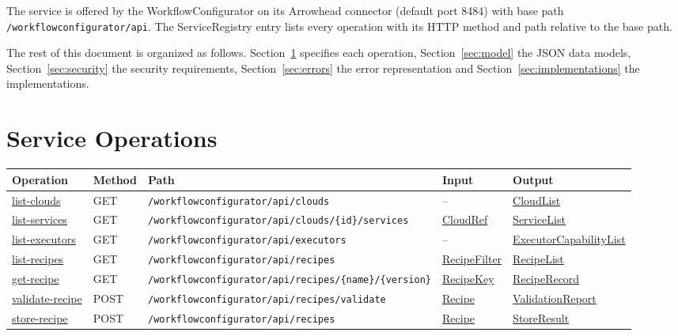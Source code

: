 \documentclass[a4paper]{arrowhead}
\newcommand{\mref}[1]{{\textcolor{ArrowheadPurple}{\hyperref[sec:model:#1]{#1}}}}
\newcommand{\oref}[1]{{\textcolor{ArrowheadBlue}{\hyperref[sec:operations:#1]{#1}}}}
\begin{document}
The service is offered by the WorkflowConfigurator on its Arrowhead connector (default port 8484) with base path \texttt{/\allowbreak{}workflowconfigurator/\allowbreak{}api}.
The ServiceRegistry entry lists every operation with its HTTP method and path relative to the base path.

The rest of this document is organized as follows. Section~\ref{sec:operations} specifies each operation,
Section~\ref{sec:model} the JSON data models, Section~\ref{sec:security} the security requirements,
Section~\ref{sec:errors} the error representation and Section~\ref{sec:implementations} the implementations.

\newpage
\section{Service Operations}
\label{sec:operations}

{\small
\begin{longtable}{|p{3.0cm}|p{1.5cm}|p{5.3cm}|p{3.0cm}|p{3.0cm}|}

\hline
\rowcolor{gray!33} Operation & Method & Path & Input & Output \\ \hline
\endhead
\oref{list-clouds} & GET & \texttt{/\allowbreak{}workflowconfigurator/\allowbreak{}api/\allowbreak{}clouds} & -- & \mref{CloudList} \\ \hline
\oref{list-services} & GET & \texttt{/\allowbreak{}workflowconfigurator/\allowbreak{}api/\allowbreak{}clouds/\allowbreak{}\{id\}/\allowbreak{}services} & \mref{CloudRef} & \mref{ServiceList} \\ \hline
\oref{list-executors} & GET & \texttt{/\allowbreak{}workflowconfigurator/\allowbreak{}api/\allowbreak{}executors} & -- & \mref{ExecutorCapabilityList} \\ \hline
\oref{list-recipes} & GET & \texttt{/\allowbreak{}workflowconfigurator/\allowbreak{}api/\allowbreak{}recipes} & \mref{RecipeFilter} & \mref{RecipeList} \\ \hline
\oref{get-recipe} & GET & \texttt{/\allowbreak{}workflowconfigurator/\allowbreak{}api/\allowbreak{}recipes/\allowbreak{}\{name\}/\allowbreak{}\{version\}} & \mref{RecipeKey} & \mref{RecipeRecord} \\ \hline
\oref{validate-recipe} & POST & \texttt{/\allowbreak{}workflowconfigurator/\allowbreak{}api/\allowbreak{}recipes/\allowbreak{}validate} & \mref{Recipe} & \mref{ValidationReport} \\ \hline
\oref{store-recipe} & POST & \texttt{/\allowbreak{}workflowconfigurator/\allowbreak{}api/\allowbreak{}recipes} & \mref{Recipe} & \mref{StoreResult} \\ \hline
\end{longtable}
}
\end{document}
